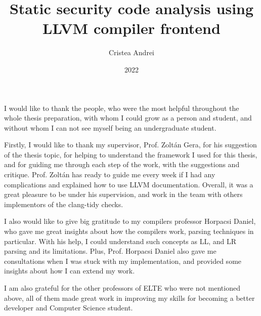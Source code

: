 \documentclass[
]{elteikthesis}[2022/04/30]
\title{Static security code analysis using LLVM compiler frontend} %
\date{2022} %
\author{Cristea Andrei}
\affiliation{Assistant Professor, PhD} %
\begin{document}

\maketitle



\tableofcontents
\cleardoublepage


\cleardoublepage

\cleardoublepage

\cleardoublepage

\cleardoublepage

\chapter*{\acklabel}

I would like to thank the people, who were the most helpful throughout the whole thesis preparation, with whom I could grow as a person and student, and without whom I can not see myself being an undergraduate student. 

Firstly, I would like to thank my supervisor, Prof. Zoltán Gera, for his suggestion of the thesis topic, for helping to understand the framework I used for this thesis, and for guiding me through each step of the work, with the suggestions and critique. Prof. Zoltán has ready to guide me every week if I had any complications and explained how to use LLVM documentation. Overall, it was a great pleasure to be under his supervision, and work in the team with others implementors of the clang-tidy checks.   

I also would like to give big gratitude to my compilers professor Horpacsi Daniel, who gave me great insights about how the compilers work, parsing techniques in particular. With his help, I could understand such concepts as LL, and LR parsing and its limitations. Plus, Prof. Horpacsi Daniel also gave me consultations when I was stuck with my implementation, and provided some insights about how I can extend my work.  

I am also grateful for the other professors of ELTE who were not mentioned above, all of them made great work in improving my skills for becoming a better developer and Computer Science student. 
\end{document}
